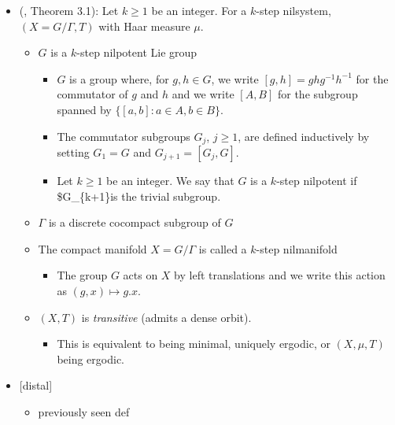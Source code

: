 \documentclass[
  british,
]{article}
\providecommand{\tightlist}{%
  \setlength{\itemsep}{0pt}\setlength{\parskip}{0pt}}
\theoremstyle{plain}
\theoremstyle{definition}
\theoremstyle{plain}
\theoremstyle{remark}
\newcommand{\Measure}{{\mu}}
\begin{document}
\begin{itemize}
\tightlist
\item
  (, Theorem 3.1):
  Let \(k\geq1\) be an integer. For a \(k\)-step nilsystem,
  \((X=G/\Gamma,T)\) with Haar measure \(\mu\).

  \begin{itemize}
  \tightlist
  \item
    \(G\) is a \(k\)-step nilpotent Lie group

    \begin{itemize}
    \tightlist
    \item
      \(G\) is a group where, for \(g,h\in G\), we write
      \([g,h]=ghg^{-1}h^{-1}\) for the commutator of \(g\) and \(h\) and
      we write \([A,B]\) for the subgroup spanned by
      \(\{[a,b]:a\in A,b\in B \}\).
    \item
      The commutator subgroups \(G_j\), \(j\geq1\), are defined
      inductively by setting \(G_1=G\) and \(G_{j+1}=[G_j,G]\).
    \item
      Let \(k\geq 1\) be an integer. We say that \(G\) is a \(k\)-step
      nilpotent if \$G\_\{k+1\}is the trivial subgroup.
    \end{itemize}
  \item
    \(\Gamma\) is a discrete cocompact subgroup of \(G\)
  \item
    The compact manifold \(X=G/\Gamma\) is called a \(k\)-step
    nilmanifold

    \begin{itemize}
    \tightlist
    \item
      The group \(G\) acts on \(X\) by left translations and we write
      this action as \((g,x)\mapsto g.x\).
    \end{itemize}
  \item
    \((X,T)\) is \emph{transitive} (admits a dense orbit).

    \begin{itemize}
    \tightlist
    \item
      This is equivalent to being minimal, uniquely ergodic, or
      \((X,\Measure,T)\) being ergodic.
    \end{itemize}
  \end{itemize}
\item
  {[}distal{]}

  \begin{itemize}
  \tightlist
  \item
    previously seen def


\end{itemize}
\end{itemize}
\end{document}

